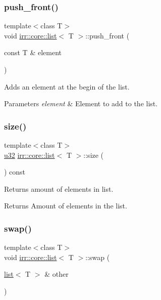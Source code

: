 \subsubsection{\texorpdfstring{push\+\_\+front()}{push\_front()}}
{\footnotesize\ttfamily template$<$class T$>$ \\
void \hyperlink{classirr_1_1core_1_1list}{irr\+::core\+::list}$<$ T $>$\+::push\+\_\+front (\begin{DoxyParamCaption}\item[{const T \&}]{element }\end{DoxyParamCaption})\hspace{0.3cm}{\ttfamily [inline]}}



Adds an element at the begin of the list. 


\begin{DoxyParams}{Parameters}
{\em element} & Element to add to the list. \\
\hline
\end{DoxyParams}
\mbox{\label{classirr_1_1core_1_1list_a374ab663f2439599a6b99b47a31e793d}} 
\subsubsection{\texorpdfstring{size()}{size()}}
{\footnotesize\ttfamily template$<$class T$>$ \\
\hyperlink{namespaceirr_a0416a53257075833e7002efd0a18e804}{u32} \hyperlink{classirr_1_1core_1_1list}{irr\+::core\+::list}$<$ T $>$\+::size (\begin{DoxyParamCaption}{ }\end{DoxyParamCaption}) const\hspace{0.3cm}{\ttfamily [inline]}}



Returns amount of elements in list. 

\begin{DoxyReturn}{Returns}
Amount of elements in the list. 
\end{DoxyReturn}
\mbox{\label{classirr_1_1core_1_1list_a860e4dab70f2ac5f13b9385f7f63d5b9}} 
\subsubsection{\texorpdfstring{swap()}{swap()}}
{\footnotesize\ttfamily template$<$class T$>$ \\
void \hyperlink{classirr_1_1core_1_1list}{irr\+::core\+::list}$<$ T $>$\+::swap (\begin{DoxyParamCaption}\item[{\hyperlink{classirr_1_1core_1_1list}{list}$<$ T $>$ \&}]{other }\end{DoxyParamCaption})\hspace{0.3cm}{\ttfamily [inline]}}



